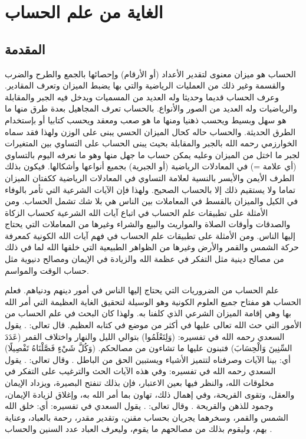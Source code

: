 \chapter{الغاية من علم الحساب}

\section{المقدمة}

الحساب هو ميزان معنوى لتقدير الأعداد (أو الأرقام) وإحصائها بالجمع والطرح والضرب والقسمة وغير ذلك من العمليات الرياضية والتي بها يضبط الميزان وتعرف المقادير. وعرف الحساب قديما وحديثا وله العديد من المسميات ويدخل فيه الجبر والمقابلة والرياضيات وله العديد من الصور والأنواع. بالحساب تعرف المجاهيل بعدة طرق منها ما هو سهل وبسيط ويحسب ذهنيا ومنها ما هو صعب ومعقد ويحسب كتابيا أو بإستخدام الطرق الحديثة. والحساب حاله كحال الميزان الحسي يبنى على الوزن ولهذا فقد سماه الخوارزمي رحمه الله بالجبر والمقابلة بحيث يبنى الحساب على التساوي بين المتغيرات لجبر ما اختل من الميزان وعليه يمكن حساب ما جهل منها وهو ما نعرفه اليوم بالتساوي (أي علامة =) في المعادلات الرياضية (أو الجبرية) بجميع أنواعها وأشكالها. فيكون بذلك الطرف الأيمن والأيسر بالنسية لعلامة التساوي في المعادلات الرياضية ككفتان الميزان تماما ولا يستقيم ذلك إلا بالحساب الصحيح. ولهذا فإن الآيات الشرعية التي تأمر بالوفاء في الكيل والميزان بالقسط في المعاملات بين الناس هي بلا شك تشمل الحساب. ومن الأمثلة على تطبيقات علم الحساب في اتباع آيات الله الشرعية كحساب الزكاة والصدقات وأوقات الصلاة والمواريث والبيع والشراء وغيرها من المعاملات التي يحتاج إليها الناس.  ومن الأمثلة على تطبيقات علم الحساب في فهم آيات الله الكونية كمعرفة حركة الشمس والقمر والأرض وغيرها من الظواهر الطبيعية التي خلقها الله لما في ذلك من مصالح دينية مثل التفكر في عظمة الله والزيادة في الإيمان ومصالح دنيوية مثل حساب الوقت والمواسم.

علم الحساب من الضروريات التي يحتاج إليها الناس في أمور دينهم ودنياهم. فعلم الحساب هو مفتاح جميع العلوم الكونية وهو الوسيلة لتحقيق الغاية العظيمة التي أمر الله بها وهي إقامة الميزان الشرعي الذي كلفنا به. ولهذا كان البحث في علم الحساب من الأمور التي حث الله تعالى عليها في أكثر من موضع في كتابه العظيم. قال تعالى: \quranayah*[17][12]{\footnotesize \surahname*[17]}. يقول السعدي رحمه الله في تفسيره: (وَلِتَعْلَمُوا) بتوالي الليل والنهار واختلاف القمر (عَدَدَ السِّنِينَ وَالْحِسَابَ) فتبنون عليها ما تشاءون من مصالحكم. (وَكُلَّ شَيْءٍ فَصَّلْنَاهُ تَفْصِيلًا) أي: بينا الآيات وصرفناه لتتميز الأشياء ويستبين الحق من الباطل \href{https://shamela.ws/book/42/1001#p1}{\faExternalLink} \cite{tafsir_Saadi}. وقال تعالى: \quranayah*[10][5]{\footnotesize \surahname*[10]}. يقول السعدي رحمه الله في تفسيره: وفي هذه الآيات الحث والترغيب على التفكر في مخلوقات الله، والنظر فيها بعين الاعتبار، فإن بذلك تنفتح البصيرة، ويزداد الإيمان والعقل، وتقوى القريحة، وفي إهمال ذلك، تهاون بما أمر الله به، وإغلاق لزيادة الإيمان، وجمود للذهن والقريحة \href{https://shamela.ws/book/42/729#p6}{\faExternalLink} \cite{tafsir_Saadi}. وقال تعالى: \quranayah*[55][5]{\footnotesize \surahname*[55]}. يقول السعدي في تفسيره: أي: خلق الله الشمس والقمر، وسخرهما يجريان بحساب مقنن، وتقدير مقدر، رحمة بالعباد، وعناية بهم، وليقوم بذلك من مصالحهم ما يقوم، وليعرف العباد عدد السنين والحساب \href{https://shamela.ws/book/42/1887#p6}{\faExternalLink} \cite{tafsir_Saadi}.

